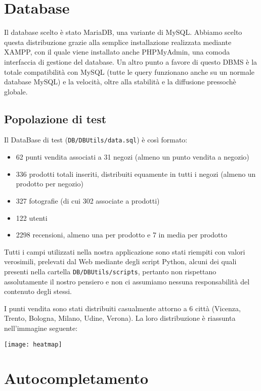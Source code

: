 \chapter{Database}

Il database scelto è stato MariaDB, una variante di MySQL. Abbiamo scelto questa distribuzione grazie alla semplice installazione realizzata mediante XAMPP, con il quale viene installato anche PHPMyAdmin, una comoda interfaccia di gestione del database. Un altro punto a favore di questo DBMS è la totale compatibilità con MySQL (tutte le query funzionano anche su un normale database MySQL) e la velocità, oltre alla stabilità e la diffusione pressochè globale.

\section{Popolazione di test}
Il DataBase di test (\texttt{DB/DBUtils/data.sql}) è così formato:
\begin{itemize}

  \item 62 punti vendita associati a 31 negozi (almeno un punto vendita a negozio)
  \item 336 prodotti totali inseriti, distribuiti equamente in tutti i negozi (almeno un prodotto per negozio)
  \item 327 fotografie (di cui 302 associate a prodotti)
  \item 122 utenti
  \item 2298 recensioni, almeno una per prodotto e 7 in media per prodotto

\end{itemize}

Tutti i campi utilizzati nella nostra applicazione sono stati riempiti con valori verosimili, prelevati dal Web mediante degli script Python, alcuni dei quali presenti nella cartella \texttt{DB/DBUtils/scripts}, pertanto non rispettano assolutamente il nostro pensiero e non ci assumiamo nessuna responsabilità del contenuto degli stessi.

I punti vendita sono stati distribuiti casualmente attorno a 6 città (Vicenza, Trento, Bologna, Milano, Udine, Verona). La loro distribuzione è riassunta nell'immagine seguente:
\begin{center}
  \texttt{[image: heatmap]}
\end{center}


\chapter{Autocompletamento}

